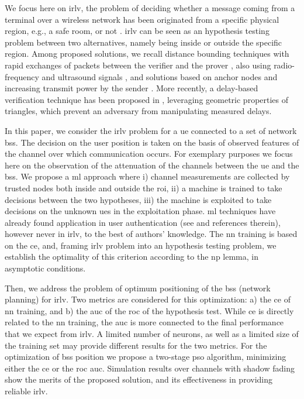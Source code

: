 \documentclass[conference,final]{IEEEtran}
\begin{document}
We focus here on  \ac{irlv},  the problem of deciding whether a message coming from a terminal over a wireless network has been originated from a specific physical region, e.g., a safe room, or not \cite{Zeng-survey}. \ac{irlv} can be seen as an hypothesis testing problem between two alternatives, namely being inside or outside the specific region. Among proposed solutions, we recall distance bounding techniques with rapid exchanges of packets between the verifier and the prover \cite{Brands}, also using radio-frequency and ultrasound signals \cite{Sastry}, and solutions based on anchor nodes and increasing transmit power by the sender \cite{Vora}. More recently, a delay-based verification technique has been proposed  in \cite{7145434}, leveraging geometric properties of triangles, which prevent an adversary from manipulating measured delays. 

In this paper, we consider the \ac{irlv} problem for a \ac{ue} connected to a set of network \acp{bs}. The decision on the user position is taken on the basis of observed features of the channel over which communication occurs. For exemplary purposes we focus here on the observation of the attenuation of the channels between the \ac{ue} and the \acp{bs}. We propose a \ac{ml} approach  where i)  channel measurements are collected by trusted nodes both inside and outside the \ac{roi}, ii)  a machine is trained to take decisions between the two hypotheses, iii) the machine is exploited to take decisions on the unknown \acp{ue} in the exploitation phase. \ac{ml} techniques have already found application in user authentication (see  \cite{xiao-2018} and references therein), however never in \ac{irlv}, to the best of authors' knowledge. The \ac{nn} training is based on the \ac{ce}, and, framing  \ac{irlv} problem into an hypothesis testing problem, we establish the optimality of this criterion according to the \ac{np} lemma, in asymptotic conditions. 

Then, we address the problem of optimum positioning of the \acp{bs} (network planning) for \ac{irlv}. Two metrics are considered for this optimization: a) the \ac{ce} of \ac{nn} training, and b) the \ac{auc} of the \ac{roc} of the hypothesis test. While \ac{ce} is directly related to the \ac{nn} training, the \ac{auc} is more connected to the final performance that we expect from \ac{irlv}. A limited number of neurons, as well as a limited size of the training set may provide different results for the two metrics. For the optimization of \acp{bs} position  we propose a two-stage \ac{pso} algorithm, minimizing either the \ac{ce} or the \ac{roc} \ac{auc}. Simulation results over channels with shadow fading show the merits of the proposed solution, and its effectiveness in providing reliable \ac{irlv}.
\end{document}
